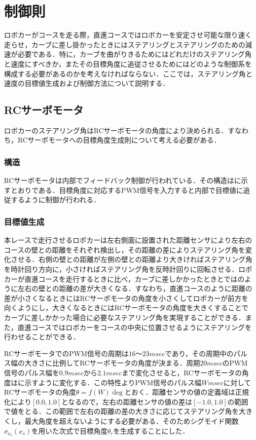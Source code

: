 \section{制御則}
  ロボカーがコースを走る際，直進コースではロボカーを安定させ可能な限り速く走らせ，カーブに差し掛かったときにはステアリングとステアリングのための減速が必要である．特に，カーブを曲がりきるためにはどれだけのステアリング角と速度にすべきか，またその目標角度に追従させるためにはどのような制御系を構成する必要があるのかを考えなければならない．ここでは，ステアリング角と速度の目標値生成および制御方法について説明する．
 
 
\subsection{RCサーボモータ}
  ロボカーのステアリング角はRCサーボモータの角度により決められる．すなわち，RCサーボモータへの目標角度生成則について考える必要がある．
  
\subsubsection{構造}
RCサーボモータは内部でフィードバック制御が行われている．その構造はに示すとおりである\cite{RCservo}．目標角度に対応するPWM信号を入力すると内部で目標値に追従するように制御が行われる．

\subsubsection{目標値生成}
  本レースで走行させるロボカーは左右側面に設置された距離センサにより左右のコースの壁との距離をそれぞれ検出し，その距離の差によりステアリング角を変化させる．右側の壁との距離が左側の壁との距離より大きければステアリング角を時計回り方向に，小さければステアリング角を反時計回りに回転させる．ロボカーが直進コースを走行するときに比べ，カーブに差しかかったときとではのように左右の壁との距離の差が大きくなる．すなわち，直進コースのように距離の差が小さくなるときにはRCサーボモータの角度を小さくしてロボカーが前方を向くようにし，大きくなるときにはRCサーボモータの角度を大きくすることでカーブに差しかかった場合に必要なステアリング角を実現することができる．また，直進コースではロボカーをコースの中央に位置させるようにステアリングを行わせることができる．
  
  RCサーボモータでのPWM信号の周期は$16〜23\unit{msec}$であり，その周期中のパルス幅の大きさに比例してRCサーボモータの角度が決まる．周期$20\unit{msec}$のPWM信号のパルス幅を$0.9\unit{msec}$から$2.1\unit{msec}$まで変化させると，RCサーボモータの角度はに示すように変化する．この特性よりPWM信号のパルス幅$W\unit{msec}$に対してRCサーボモータの角度$\theta=f(W)\unit{\deg}$とおく．距離センサの値の定義域は正規化により$[0.0,1.0]$となるので，左右の距離センサの値の差は$[-1.0,1.0]$の範囲で値をとる．この範囲で左右の距離の差の大きさに応じてステアリング角を大きくし，最大角度を超えないようにする必要がある．そのためシグモイド関数$\sigma_{a_{s}}(x_{s}) $を用いた次式で目標角度$\theta_{r} $を生成することにした．

